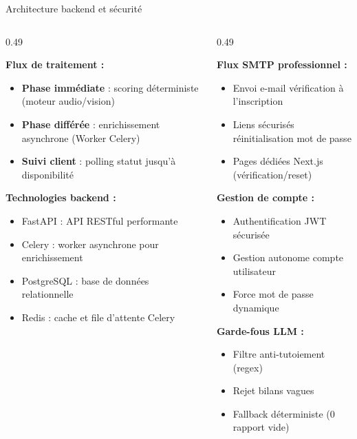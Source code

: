\documentclass[10pt,aspectratio=169]{beamer}
\begin{document}
\begin{frame}{Architecture backend et sécurité}
\begin{columns}[T]
\begin{column}{0.49\textwidth}
\begin{tcolorbox}[title=Architecture hybride découplée, colframe=primary, colback=primary!3]
\small
\textbf{Flux de traitement :}
\begin{itemize}
    \item \textbf{Phase immédiate} : scoring déterministe (moteur audio/vision)
    \item \textbf{Phase différée} : enrichissement asynchrone (Worker Celery)
    \item \textbf{Suivi client} : polling statut jusqu'à disponibilité
\end{itemize}
\textbf{Technologies backend :}
\begin{itemize}
    \item FastAPI : API RESTful performante
    \item Celery : worker asynchrone pour enrichissement
    \item PostgreSQL : base de données relationnelle
    \item Redis : cache et file d'attente Celery
\end{itemize}
\end{tcolorbox}
\end{column}
\begin{column}{0.49\textwidth}
\begin{tcolorbox}[title=Sécurité et authentification, colframe=accent, colback=accent!3]
\small
\textbf{Flux SMTP professionnel :}
\begin{itemize}
    \item Envoi e-mail vérification à l'inscription
    \item Liens sécurisés réinitialisation mot de passe
    \item Pages dédiées Next.js (vérification/reset)
\end{itemize}
\textbf{Gestion de compte :}
\begin{itemize}
    \item Authentification JWT sécurisée
    \item Gestion autonome compte utilisateur
    \item Force mot de passe dynamique
\end{itemize}
\textbf{Garde-fous LLM :}
\begin{itemize}
    \item Filtre anti-tutoiement (regex)
    \item Rejet bilans vagues
    \item Fallback déterministe (0 rapport vide)
\end{itemize}
\end{tcolorbox}
\end{column}
\end{columns}
\end{frame}
\end{document}

